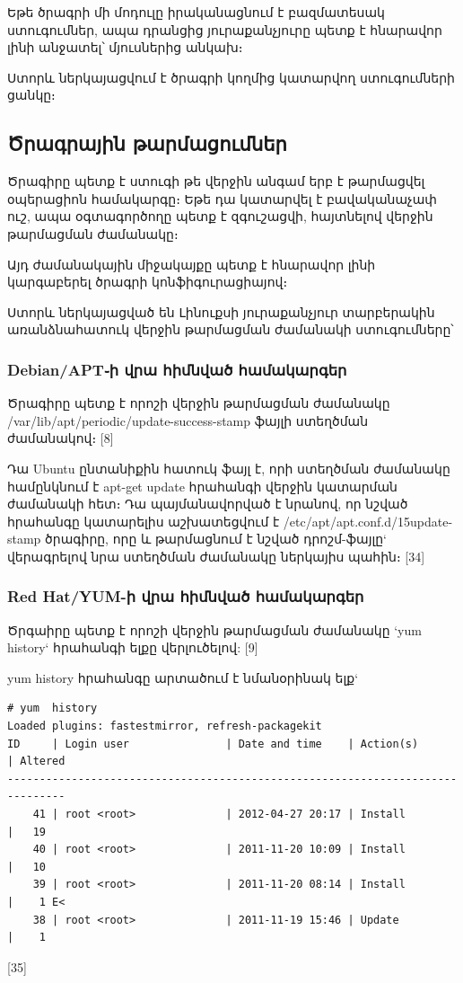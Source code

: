 \documentclass[a4paper,12pt]{article}
\begin{document}
\begin{sloppypar}
Եթե ծրագրի մի մոդուլը իրականացնում է բազմատեսակ ստուգումներ,
ապա դրանցից յուրաքանչյուրը պետք է հնարավոր լինի անջատել՝
մյուսներից անկախ։

Ստորև ներկայացվում է ծրագրի կողմից կատարվող ստուգումների ցանկը։


\subsection{Ծրագրային թարմացումներ}

Ծրագիրը պետք է ստուգի թե վերջին անգամ երբ է թարմացվել
օպերացիոն համակարգը։
Եթե դա կատարվել է բավականաչափ ուշ, ապա օգտագործողը պետք է
զգուշացվի, հայտնելով վերջին թարմացման ժամանակը։

Այդ ժամանակային միջակայքը պետք է հնարավոր լինի կարգաբերել ծրագրի կոնֆիգուրացիայով։

Ստորև ներկայացված են Լինուքսի յուրաքանչյուր տարբերակին առանձնահատուկ
վերջին թարմացման ժամանակի ստուգումները՝

\subsubsection{Debian/APT֊ի վրա հիմնված համակարգեր}

Ծրագիրը պետք է որոշի վերջին թարմացման ժամանակը
/var/lib/apt/periodic/update-success-stamp
ֆայլի ստեղծման ժամանակով։ [8]

Դա Ubuntu ընտանիքին հատուկ ֆայլ է, որի ստեղծման ժամանակը համընկնում է
apt-get update հրահանգի վերջին կատարման ժամանակի հետ։ Դա պայմանավորված է
նրանով, որ նշված հրահանգը կատարելիս աշխատեցվում է
/etc/apt/apt.conf.d/15update-stamp
ծրագիրը, որը և թարմացնում է նշված դրոշմ-ֆայլը` վերագրելով նրա
ստեղծման ժամանակը ներկայիս պահին։
[34]

\subsubsection{Red Hat/YUM-ի վրա հիմնված համակարգեր}

Ծրգաիրը պետք է որոշի վերջին թարմացման ժամանակը `yum history`
հրահանգի ելքը վերլուծելով: [9]

yum history հրահանգը արտածում է նմանօրինակ ելք`

\begin{lstlisting}[language={}]
# yum  history
Loaded plugins: fastestmirror, refresh-packagekit
ID     | Login user               | Date and time    | Action(s)      | Altered
-------------------------------------------------------------------------------
    41 | root <root>              | 2012-04-27 20:17 | Install        |   19   
    40 | root <root>              | 2011-11-20 10:09 | Install        |   10   
    39 | root <root>              | 2011-11-20 08:14 | Install        |    1 E<
    38 | root <root>              | 2011-11-19 15:46 | Update         |    1 
\end{lstlisting}
[35]


\end{sloppypar}
\end{document}
